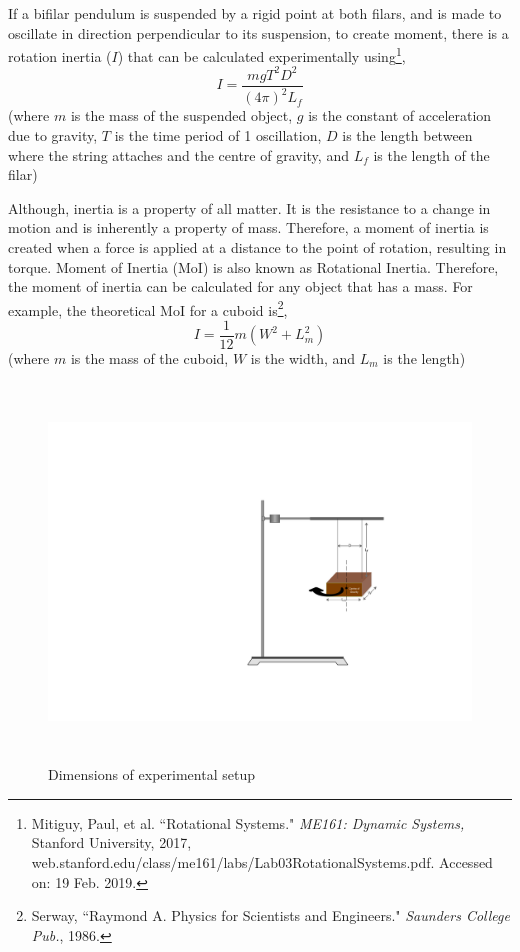 \documentclass[a4paper,12pt]{article}
\theoremstyle{definition}
\begin{document}
If a bifilar pendulum is suspended by a rigid point at both filars, and is made to oscillate in direction perpendicular to its suspension, to create moment, there is a rotation inertia ($I$) that can be calculated experimentally using\footnote{Mitiguy, Paul, et al. ``Rotational Systems." \textit{ME161: Dynamic Systems,} Stanford University, 2017, web.stanford.edu/class/me161/labs/Lab03RotationalSystems.pdf. Accessed on: 19 Feb. 2019.},
\begin{equation}\label{eq:experimental}
	I=\frac{mgT^2 D^2}{(4\pi)^2 L_f}
\end{equation}
(where $m$ is the mass of the suspended object, $g$ is the constant of acceleration due to gravity, $T$ is the time period of 1 oscillation, $D$ is the length between where the string attaches and the centre of gravity, and $L_f$ is the length of the filar)

Although, inertia is a property of all matter. It is the resistance to a change in motion and is inherently a property of mass. Therefore, a moment of inertia is created when a force is applied at a distance to the point of rotation, resulting in torque. Moment of Inertia (MoI) is also known as Rotational Inertia. Therefore, the moment of inertia can be calculated for any object that has a mass. For example, the theoretical MoI for a cuboid is\footnote{Serway, ``Raymond A. Physics for Scientists and Engineers." \textit{Saunders College Pub.}, 1986.},
\begin{equation}\label{eq:theorectical}
	I = \frac{1}{12}m(W^2+L_m^2)
\end{equation}
(where $m$ is the mass of the cuboid, $W$ is the width, and $L_m$ is the length)

\begin{figure}[h]
    \centering
    \includegraphics[width=\textwidth,height=10cm,keepaspectratio]{setup2.pdf}
    \caption{Dimensions of experimental setup}
    \label{fig:measurements}
\end{figure}
\end{document}
